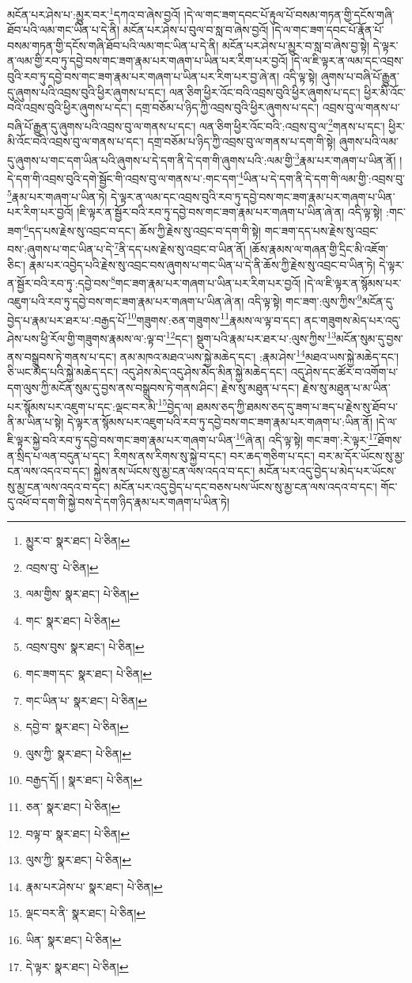 མངོན་པར་ཤེས་པ་:མྱུར་བར་\footnote{མྱུར་བ་  སྣར་ཐང་།  པེ་ཅིན། }དཀའ་བ་ཞེས་བྱའོ། །དེ་ལ་གང་ཟག་དབང་པོ་རྟུལ་པོ་བསམ་གཏན་གྱི་དངོས་གཞི་ཐོབ་པའི་ལམ་གང་ཡིན་པ་དེ་ནི། མངོན་པར་ཤེས་པ་བུལ་བ་སླ་བ་ཞེས་བྱའོ། །དེ་ལ་གང་ཟག་དབང་པོ་རྣོན་པོ་བསམ་གཏན་གྱི་དངོས་གཞི་ཐོབ་པའི་ལམ་གང་ཡིན་པ་དེ་ནི། མངོན་པར་ཤེས་པ་མྱུར་བ་སླ་བ་ཞེས་བྱ་སྟེ། དེ་ལྟར་ན་ལམ་གྱི་རབ་ཏུ་དབྱེ་བས་གང་ཟག་རྣམ་པར་གཞག་པ་ཡིན་པར་རིག་པར་བྱའོ། །དེ་ལ་ཇི་ལྟར་ན་ལམ་དང་འབྲས་བུའི་རབ་ཏུ་དབྱེ་བས་གང་ཟག་རྣམ་པར་གཞག་པ་ཡིན་པར་རིག་པར་བྱ་ཞེ་ན། འདི་ལྟ་སྟེ། ཞུགས་པ་བཞི་པོ་རྒྱུན་དུ་ཞུགས་པའི་འབྲས་བུའི་ཕྱིར་ཞུགས་པ་དང་། ལན་ཅིག་ཕྱིར་འོང་བའི་འབྲས་བུའི་ཕྱིར་ཞུགས་པ་དང་། ཕྱིར་མི་འོང་བའི་འབྲས་བུའི་ཕྱིར་ཞུགས་པ་དང་། དགྲ་བཅོམ་པ་ཉིད་ཀྱི་འབྲས་བུའི་ཕྱིར་ཞུགས་པ་དང་། འབྲས་བུ་ལ་གནས་པ་བཞི་པོ་རྒྱུན་དུ་ཞུགས་པའི་འབྲས་བུ་ལ་གནས་པ་དང་། ལན་ཅིག་ཕྱིར་འོང་བའི་:འབྲས་བུ་ལ་\footnote{འབྲས་བུ་  པེ་ཅིན། }གནས་པ་དང་། ཕྱིར་མི་འོང་བའི་འབྲས་བུ་ལ་གནས་པ་དང་། དགྲ་བཅོམ་པ་ཉིད་ཀྱི་འབྲས་བུ་ལ་གནས་པ་དག་གི་སྟེ། ཞུགས་པའི་ལམ་དུ་ཞུགས་པ་གང་དག་ཡིན་པའི་ཞུགས་པ་དེ་དག་ནི་དེ་དག་གི་ཞུགས་པའི་:ལམ་གྱི་\footnote{ལམ་གྱིས་  སྣར་ཐང་།  པེ་ཅིན། }རྣམ་པར་གཞག་པ་ཡིན་ནོ། །དེ་དག་གི་འབྲས་བུའི་དགེ་སྦྱོང་གི་འབྲས་བུ་ལ་གནས་པ་:གང་དག་\footnote{གང་  སྣར་ཐང་།  པེ་ཅིན། }ཡིན་པ་དེ་དག་ནི་དེ་དག་གི་ལམ་གྱི་:འབྲས་བུ་\footnote{འབྲས་བུས་  སྣར་ཐང་།  པེ་ཅིན། }རྣམ་པར་གཞག་པ་ཡིན་ཏེ། དེ་ལྟར་ན་ལམ་དང་འབྲས་བུའི་རབ་ཏུ་དབྱེ་བས་གང་ཟག་རྣམ་པར་གཞག་པ་ཡིན་པར་རིག་པར་བྱའོ། །ཇི་ལྟར་ན་སྦྱོར་བའི་རབ་ཏུ་དབྱེ་བས་གང་ཟག་རྣམ་པར་གཞག་པ་ཡིན་ཞེ་ན། འདི་ལྟ་སྟེ། :གང་ཟག་\footnote{གང་ཟག་དང་  སྣར་ཐང་།  པེ་ཅིན། }དད་པས་རྗེས་སུ་འབྲང་བ་དང་། ཆོས་ཀྱི་རྗེས་སུ་འབྲང་བ་དག་གི་སྟེ། གང་ཟག་དད་པས་རྗེས་སུ་འབྲང་བས་:ཞུགས་པ་གང་ཡིན་པ་དེ་\footnote{གང་ཡིན་པ་  སྣར་ཐང་།  པེ་ཅིན། }ནི་དད་པས་རྗེས་སུ་འབྲང་བ་ཡིན་ནོ། །ཆོས་རྣམས་ལ་གཞན་གྱི་དྲིང་མི་འཇོག་ཅིང་། རྣམ་པར་འབྱེད་པའི་རྗེས་སུ་འབྲང་བས་ཞུགས་པ་གང་ཡིན་པ་དེ་ནི་ཆོས་ཀྱི་རྗེས་སུ་འབྲང་བ་ཡིན་ཏེ། དེ་ལྟར་ན་སྦྱོར་བའི་རབ་ཏུ་:དབྱེ་བས་\footnote{དབྱེ་བ་  སྣར་ཐང་།  པེ་ཅིན། }གང་ཟག་རྣམ་པར་གཞག་པ་ཡིན་པར་རིག་པར་བྱའོ། །དེ་ལ་ཇི་ལྟར་ན་སྙོམས་པར་འཇུག་པའི་རབ་ཏུ་དབྱེ་བས་གང་ཟག་རྣམ་པར་གཞག་པ་ཡིན་ཞེ་ན། འདི་ལྟ་སྟེ། གང་ཟག་:ལུས་ཀྱིས་\footnote{ལུས་ཀྱི་  སྣར་ཐང་།  པེ་ཅིན། }མངོན་དུ་བྱེད་པ་རྣམ་པར་ཐར་པ་:བརྒྱད་པོ་\footnote{བརྒྱད་དོ། །  སྣར་ཐང་།  པེ་ཅིན། }གཟུགས་:ཅན་གཟུགས་\footnote{ཅན་  སྣར་ཐང་།  པེ་ཅིན། }རྣམས་ལ་ལྟ་བ་དང་། ནང་གཟུགས་མེད་པར་འདུ་ཤེས་པས་ཕྱི་རོལ་གྱི་གཟུགས་རྣམས་ལ་:ལྟ་བ་\footnote{བལྟ་བ་  སྣར་ཐང་།  པེ་ཅིན། }དང་། སྡུག་པའི་རྣམ་པར་ཐར་པ་:ལུས་ཀྱིས་\footnote{ལུས་ཀྱི་  སྣར་ཐང་།  པེ་ཅིན། }མངོན་སུམ་དུ་བྱས་ནས་བསྒྲུབས་ཏེ་གནས་པ་དང་། ནམ་མཁའ་མཐའ་ཡས་སྐྱེ་མཆེད་དང་། :རྣམ་ཤེས་\footnote{རྣམ་པར་ཤེས་པ་  སྣར་ཐང་།  པེ་ཅིན། }མཐའ་ཡས་སྐྱེ་མཆེད་དང་། ཅི་ཡང་མེད་པའི་སྐྱེ་མཆེད་དང་། འདུ་ཤེས་མེད་འདུ་ཤེས་མེད་མིན་སྐྱེ་མཆེད་དང་། འདུ་ཤེས་དང་ཚོར་བ་འགོག་པ་དག་ལུས་ཀྱི་མངོན་སུམ་དུ་བྱས་ནས་བསྒྲུབས་ཏེ་གནས་ཤིང་། རྗེས་སུ་མཐུན་པ་དང་། རྗེས་སུ་མཐུན་པ་མ་ཡིན་པར་སྙོམས་པར་འཇུག་པ་དང་:ལྡང་བར་མི་\footnote{ལྡང་བར་ནི་  སྣར་ཐང་།  པེ་ཅིན། }བྱེད་ལ། ཐམས་ཅད་ཀྱི་ཐམས་ཅད་དུ་ཟག་པ་ཟད་པ་རྗེས་སུ་ཐོབ་པ་ནི་མ་ཡིན་པ་སྟེ། དེ་ལྟར་ན་སྙོམས་པར་འཇུག་པའི་རབ་ཏུ་དབྱེ་བས་གང་ཟག་རྣམ་པར་གཞག་པ་:ཡིན་ནོ། །དེ་ལ་ཇི་ལྟར་སྐྱེ་བའི་རབ་ཏུ་དབྱེ་བས་གང་ཟག་རྣམ་པར་གཞག་པ་ཡིན་\footnote{ཡིན་  སྣར་ཐང་།  པེ་ཅིན། }ཞེ་ན། འདི་ལྟ་སྟེ། གང་ཟག་:རེ་ལྟར་\footnote{དེ་ལྟར་  སྣར་ཐང་།  པེ་ཅིན། }ཐོགས་ན་སྲིད་པ་ལན་བདུན་པ་དང་། རིགས་ནས་རིགས་སུ་སྐྱེ་བ་དང་། བར་ཆད་གཅིག་པ་དང་། བར་མ་དོར་ཡོངས་སུ་མྱ་ངན་ལས་འདའ་བ་དང་། སྐྱེས་ནས་ཡོངས་སུ་མྱ་ངན་ལས་འདའ་བ་དང་། མངོན་པར་འདུ་བྱེད་པ་མེད་པར་ཡོངས་སུ་མྱ་ངན་ལས་འདའ་བ་དང་། མངོན་པར་འདུ་བྱེད་པ་དང་བཅས་པས་ཡོངས་སུ་མྱ་ངན་ལས་འདའ་བ་དང་། གོང་དུ་འཕོ་བ་དག་གི་སྐྱེ་བས་དེ་དག་ཉིད་རྣམ་པར་གཞག་པ་ཡིན་ཏེ། 